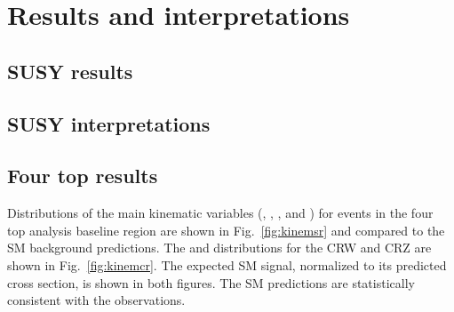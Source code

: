 \chapter{Results and interpretations}
\label{sec:results}
\section{SUSY results}
\label{sec:ssresults}

\section{SUSY interpretations}
\label{sec:ssresults}

\section{Four top results}
\label{sec:ftresults}

Distributions of the main kinematic variables (\Njets, \Nbjets, \HT, and
\ptmiss) for events in the four top analysis baseline region are shown in Fig.~\ref{fig:kinemsr} and compared
to the SM background predictions. The \Njets and \Nbjets distributions for
the CRW and CRZ are shown in Fig.~\ref{fig:kinemcr}. The expected SM \tttt
signal, normalized to its predicted cross section, is shown in both figures.
The SM predictions are statistically consistent with the observations.

